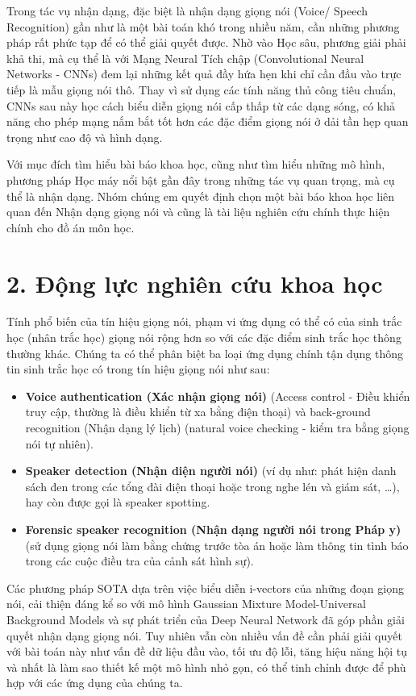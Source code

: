 \documentclass{article}
\begin{document}
	Trong tác vụ nhận dạng, đặc biệt là nhận dạng giọng nói (Voice/ Speech Recognition) gần như là một bài toán khó trong nhiều năm, cần những phương pháp rất phức tạp để có thể giải quyết được. Nhờ vào Học sâu, phương giải phải khả thi, mà cụ thể là với Mạng Neural Tích chập (Convolutional Neural Networks - CNNs) đem lại những kết quả đầy hứa hẹn khi chỉ cần đầu vào trực tiếp là mẫu giọng nói thô. Thay vì sử dụng các tính năng thủ công tiêu chuẩn, CNNs sau này học cách biểu diễn giọng nói cấp thấp từ các dạng sóng, có khả năng cho phép mạng nắm bắt tốt hơn các đặc điểm giọng nói ở dải tần hẹp quan trọng như cao độ và hình dạng.
	
	Với mục đích tìm hiểu bài báo khoa học, cũng như tìm hiểu những mô hình, phương pháp Học máy nổi bật gần đây trong những tác vụ quan trọng, mà cụ thể là nhận dạng. Nhóm chúng em quyết định chọn một bài báo khoa học liên quan đến Nhận dạng giọng nói và cũng là tài liệu nghiên cứu chính thực hiện chính cho đồ án môn học.
	
	\section{2. Động lực nghiên cứu khoa học}
	\qquad Tính phổ biến của tín hiệu giọng nói, phạm vi ứng dụng có thể có của sinh trắc học (nhân trắc học) giọng nói rộng hơn so với các đặc điểm sinh trắc học thông thường khác. Chúng ta có thể phân biệt ba loại ứng dụng chính tận dụng thông tin sinh trắc học có trong tín hiệu giọng nói như sau:
	\begin{itemize}
		\item \textbf{Voice authentication (Xác nhận giọng nói)} (Access control - Điều khiển truy cập, thường là điều khiển từ xa bằng điện thoại) và back-ground recognition (Nhận dạng lý lịch) (natural voice checking - kiểm tra bằng giọng nói tự nhiên).
		\item \textbf{Speaker detection (Nhận diện người nói)} (ví dụ như: phát hiện danh sách đen trong các tổng đài điện thoại hoặc trong nghe lén và giám sát, …), hay còn được gọi là speaker spotting.
		\item \textbf{Forensic speaker recognition (Nhận dạng người nói trong Pháp y)} (sử dụng giọng nói làm bằng chứng trước tòa án hoặc làm thông tin tình báo trong các cuộc điều tra của cảnh sát hình sự).
	\end{itemize}
	\qquad Các phương pháp SOTA dựa trên việc biểu diễn i-vectors của những đoạn giọng nói, cải thiện đáng kể so với mô hình Gaussian Mixture Model-Universal Background Models và sự phát triển của Deep Neural Network đã góp phần giải quyết nhận dạng giọng nói. Tuy nhiên vẫn còn nhiều vấn đề cần phải giải quyết với bài toán này như vấn đề dữ liệu đầu vào, tối ưu độ lỗi, tăng hiệu năng hội tụ và nhất là làm sao thiết kế một mô hình nhỏ gọn, có thể tinh chỉnh được để phù hợp với các ứng dụng của chúng ta.
	
\end{document}

